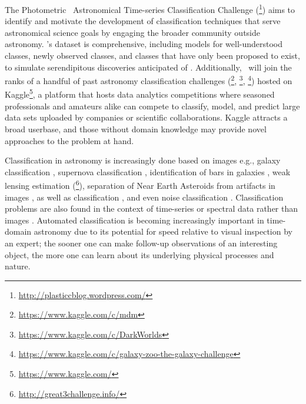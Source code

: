 The Photometric \lsst\ Astronomical Time-series Classification Challenge (\plasticc\footnote{\url{http://plasticcblog.wordpress.com/}}) aims to identify and motivate the development of classification techniques that serve astronomical science goals by engaging the broader community outside astronomy.
\plasticc's dataset is comprehensive, including models for well-understood classes, newly observed classes, and classes that have only been proposed to exist, to simulate serendipitous discoveries anticipated of \lsst.
Additionally, \plasticc\ will join the ranks of a handful of past astronomy classification challenges (\citet{kitching_gravitational_2011}\footnote{\url{https://www.kaggle.com/c/mdm}}, \citet{harvey_observing_2013}\footnote{\url{https://www.kaggle.com/c/DarkWorlds}},  \citet{dieleman_rotation-invariant_2015}\footnote{\url{https://www.kaggle.com/c/galaxy-zoo-the-galaxy-challenge}}) hosted on Kaggle\footnote{\url{https://www.kaggle.com/}}, a platform that hosts data analytics competitions where seasoned professionals and amateurs alike can compete to classify, model, and predict large data sets uploaded by companies or scientific collaborations.
Kaggle attracts a broad userbase, and those without domain knowledge may provide novel approaches to the problem at hand.

Classification in astronomy is increasingly done based on images e.g., galaxy classification \citep{hoyle_measuring_2016}, supernova classification \citep{cabrera-vives_deep-hits:_2017}, identification of bars in galaxies \citep{abraham_detection_2018}, weak lensing estimation (\citet{mandelbaum_third_2014}\footnote{\url{http://great3challenge.info/}}), separation of Near Earth Asteroids from artifacts in images \citep{morii_machine-learning_2016}, as well as  classification \citep{morii_machine-learning_2016, mahabal_deep-learnt_2017, zevin_gravity_2017}, and even noise classification \citep{zevin_gravity_2017, george_classification_2018}.
Classification problems are also found in the context of time-series or spectral data rather than images \citep[e.g.]{richards_construction_2012,newling_statistical_2011,armstrong_k2_2016,moller_photometric_2016,2015ApJS..219...39R, 2013MNRAS.430..509I}.
Automated classification \citep{djorgovski_towards_2011, djorgovski_flashes_2012, narayan_machine_2018, bloom_automating_2012} is becoming increasingly important in time-domain astronomy due to its potential for speed relative to visual inspection by an expert; the sooner one can make follow-up observations of an interesting object, the more one can learn about its underlying physical processes and nature.

